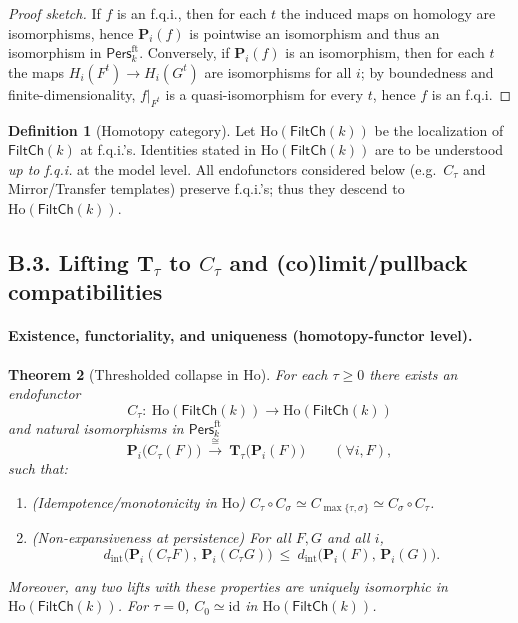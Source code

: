 \documentclass[11pt]{article}
\newcommand{\Pers}{\mathsf{Pers}}
\newcommand{\Ho}{\mathrm{Ho}}
\numberwithin{equation}{section}
\newtheorem{theorem}{Theorem}[section]
\theoremstyle{definition}
\newtheorem{definition}[theorem]{Definition}
\begin{document}
\begin{proof}[Proof sketch]
If \(f\) is an f.q.i., then for each \(t\) the induced maps on homology are isomorphisms, hence \(\mathbf{P}_i(f)\) is pointwise an isomorphism and thus an isomorphism in \(\Pers^{\mathrm{ft}}_k\).
Conversely, if \(\mathbf{P}_i(f)\) is an isomorphism, then for each \(t\) the maps \(H_i(F^t)\to H_i(G^t)\) are isomorphisms for all \(i\); by boundedness and finite-dimensionality, \(f|_{F^t}\) is a quasi-isomorphism for every \(t\), hence \(f\) is an f.q.i.
\end{proof}

\begin{definition}[Homotopy category]
Let \(\Ho(\mathsf{FiltCh}(k))\) be the localization of \(\mathsf{FiltCh}(k)\) at f.q.i.’s.
Identities stated in \(\Ho(\mathsf{FiltCh}(k))\) are to be understood \emph{up to f.q.i.} at the model level.
All endofunctors considered below (e.g.\ \(C_\tau\) and Mirror/Transfer templates) preserve f.q.i.’s; thus they descend to \(\Ho(\mathsf{FiltCh}(k))\).
\end{definition}

\subsection*{B.3. Lifting \texorpdfstring{$\mathbf{T}_\tau$}{T\_\tau} to \texorpdfstring{$C_\tau$}{C\_\tau} and (co)limit/pullback compatibilities}

\paragraph*{Existence, functoriality, and uniqueness (homotopy-functor level).}
\begin{theorem}[Thresholded collapse in \(\Ho\)]\label{B:thm:Ctau}
For each \(\tau\ge 0\) there exists an endofunctor
\[
C_\tau:\ \Ho(\mathsf{FiltCh}(k))\longrightarrow \Ho(\mathsf{FiltCh}(k))
\]
and natural isomorphisms in \(\Pers^{\mathrm{ft}}_k\)
\[
\mathbf{P}_i\!\big(C_\tau(F)\big)\ \xrightarrow{\ \cong\ }\ \mathbf{T}_\tau\!\big(\mathbf{P}_i(F)\big)\qquad(\forall i,F),
\]
such that:
\begin{enumerate}\itemsep0.2em
  \item (\emph{Idempotence/monotonicity in \(\Ho\)})
  \(C_\tau\circ C_\sigma \simeq C_{\max\{\tau,\sigma\}}\simeq C_\sigma\circ C_\tau\).
  \item (\emph{Non-expansiveness at persistence})
  For all \(F,G\) and all \(i\),
  \[
  d_{\mathrm{int}}\!\big(\mathbf{P}_i(C_\tau F),\,\mathbf{P}_i(C_\tau G)\big)\ \le\ d_{\mathrm{int}}\!\big(\mathbf{P}_i(F),\,\mathbf{P}_i(G)\big).
  \]
\end{enumerate}
Moreover, any two lifts with these properties are uniquely isomorphic in \(\Ho(\mathsf{FiltCh}(k))\).
For \(\tau=0\), \(C_0\simeq \mathrm{id}\) in \(\Ho(\mathsf{FiltCh}(k))\).
\end{theorem}
\end{document}
